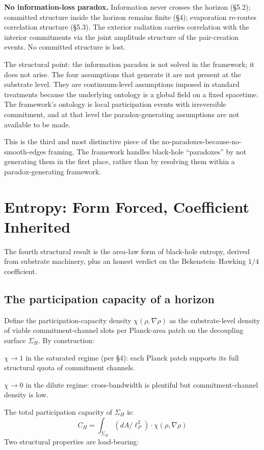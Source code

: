 \documentclass[11pt,a4paper]{article}
\begin{document}
\textbf{No information-loss paradox.} Information never crosses the horizon (\S5.2); committed structure inside the horizon remains finite (\S4); evaporation re-routes correlation structure (\S5.3). The exterior radiation carries correlation with the interior commitments via the joint amplitude structure of the pair-creation events. No committed structure is lost.

The structural point: the information paradox is not solved in the framework; it does not arise. The four assumptions that generate it are not present at the substrate level. They are continuum-level assumptions imposed in standard treatments because the underlying ontology is a global field on a fixed spacetime. The framework's ontology is local participation events with irreversible commitment, and at that level the paradox-generating assumptions are not available to be made.

This is the third and most distinctive piece of the no-paradoxes-because-no-smooth-edges framing. The framework handles black-hole ``paradoxes'' by not generating them in the first place, rather than by resolving them within a paradox-generating framework.

\section{Entropy: Form Forced, Coefficient Inherited}

The fourth structural result is the area-law form of black-hole entropy, derived from substrate machinery, plus an honest verdict on the Bekenstein--Hawking $1/4$ coefficient.

\subsection{The participation capacity of a horizon}

Define the participation-capacity density $\chi(\rho, \nabla\rho)$ as the substrate-level density of viable commitment-channel slots per Planck-area patch on the decoupling surface $\Sigma_H$. By construction:

$\chi \to 1$ in the saturated regime (per \S4): each Planck patch supports its full structural quota of commitment channels.

$\chi \to 0$ in the dilute regime: cross-bandwidth is plentiful but commitment-channel density is low.

The total participation capacity of $\Sigma_H$ is:
\[
C_H = \int_{\Sigma_H} (dA / \ell_P^{2}) \cdot \chi(\rho, \nabla\rho)
\]
Two structural properties are load-bearing:
\end{document}
